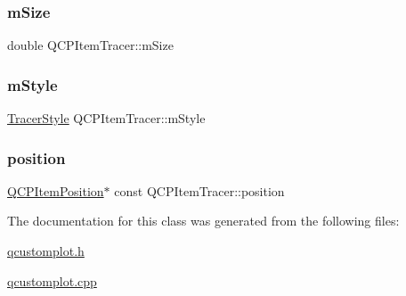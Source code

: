 \subsubsection{\texorpdfstring{m\+Size}{mSize}}
{\footnotesize\ttfamily double Q\+C\+P\+Item\+Tracer\+::m\+Size\hspace{0.3cm}{\ttfamily [protected]}}

\mbox{\label{class_q_c_p_item_tracer_afb1f236bebf417544e0138fef22a292e}} 
\subsubsection{\texorpdfstring{m\+Style}{mStyle}}
{\footnotesize\ttfamily \hyperlink{class_q_c_p_item_tracer_a2f05ddb13978036f902ca3ab47076500}{Tracer\+Style} Q\+C\+P\+Item\+Tracer\+::m\+Style\hspace{0.3cm}{\ttfamily [protected]}}

\mbox{\label{class_q_c_p_item_tracer_a69917e2fdb2b3a929c196958feee7cbe}} 
\subsubsection{\texorpdfstring{position}{position}}
{\footnotesize\ttfamily \hyperlink{class_q_c_p_item_position}{Q\+C\+P\+Item\+Position}$\ast$ const Q\+C\+P\+Item\+Tracer\+::position}



The documentation for this class was generated from the following files\+:\begin{DoxyCompactItemize}
\item 
\hyperlink{qcustomplot_8h}{qcustomplot.\+h}\item 
\hyperlink{qcustomplot_8cpp}{qcustomplot.\+cpp}\end{DoxyCompactItemize}
